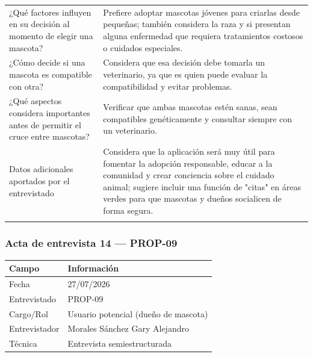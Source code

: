 \documentclass[journal,onecolumn]{IEEEtran}
\begin{document}
{\begin{longtable}{@{}p{5.6cm} p{9.4cm}@{}}
			¿Qué factores influyen en su decisión al momento de elegir una mascota? & Prefiere adoptar mascotas jóvenes para criarlas desde pequeñas; también considera la raza y si presentan alguna enfermedad que requiera tratamientos costosos o cuidados especiales. \\ \addlinespace
			
			¿Cómo decide si una mascota es compatible con otra? & Considera que esa decisión debe tomarla un veterinario, ya que es quien puede evaluar la compatibilidad y evitar problemas. \\ \addlinespace
			
			¿Qué aspectos considera importantes antes de permitir el cruce entre mascotas? & Verificar que ambas mascotas estén sanas, sean compatibles genéticamente y consultar siempre con un veterinario. \\ \addlinespace
			
			Datos adicionales aportados por el entrevistado & Considera que la aplicación será muy útil para fomentar la adopción responsable, educar a la comunidad y crear conciencia sobre el cuidado animal; sugiere incluir una función de "citas" en áreas verdes para que mascotas y dueños socialicen de forma segura. \\ \addlinespace
			
		\end{longtable}
	}
	
	
	\subsubsection*{Acta de entrevista 14 --- PROP-09}
	
	\begin{table}[H]
		\centering\small
		\begin{tabularx}{\textwidth}{@{}l X@{}}
			\toprule
			\textbf{Campo} & \textbf{Información} \\
			\midrule
			
			Fecha & 27/07/2026 \\
			
			Entrevistado & PROP-09 \\
			
			Cargo/Rol & Usuario potencial (dueño de mascota) \\
			
			Entrevistador & Morales Sánchez Gary Alejandro \\
			
			Técnica & Entrevista semiestructurada \\
			
			\bottomrule
		\end{tabularx}
	\end{table}
	
\end{document}
